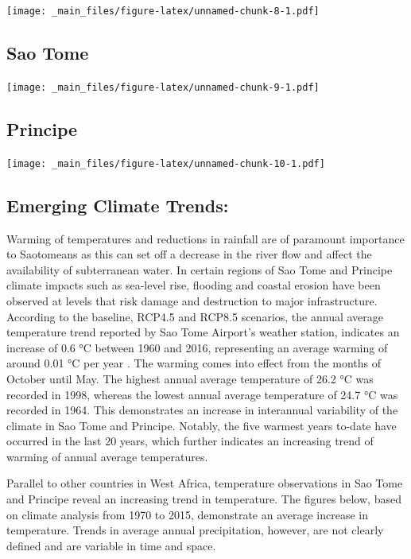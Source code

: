 \documentclass[
]{book}
\begin{document}
\texttt{[image: \_main\_files/figure-latex/unnamed-chunk-8-1.pdf]}

\hypertarget{sao-tome}{%
\subsection{Sao Tome}\label{sao-tome}}

\texttt{[image: \_main\_files/figure-latex/unnamed-chunk-9-1.pdf]}

\hypertarget{principe}{%
\subsection{Principe}\label{principe}}

\texttt{[image: \_main\_files/figure-latex/unnamed-chunk-10-1.pdf]}

\hypertarget{emerging-climate-trends}{%
\subsection{Emerging Climate Trends:}\label{emerging-climate-trends}}

Warming of temperatures and reductions in rainfall are of paramount importance to Saotomeans as this can set off a decrease in the river flow and affect the availability of subterranean water. In certain regions of Sao Tome and Principe climate impacts such as sea-level rise, flooding and coastal erosion have been observed at levels that risk damage and destruction to major infrastructure. According to the baseline, RCP4.5 and RCP8.5 scenarios, the annual average temperature trend reported by Sao Tome Airport's weather station, indicates an increase of 0.6 °C between 1960 and 2016, representing an average warming of around 0.01 °C per year . The warming comes into effect from the months of October until May. The highest annual average temperature of 26.2 °C was recorded in 1998, whereas the lowest annual average temperature of 24.7 °C was recorded in 1964. This demonstrates an increase in interannual variability of the climate in Sao Tome and Principe. Notably, the five warmest years to-date have occurred in the last 20 years, which further indicates an increasing trend of warming of annual average temperatures.

Parallel to other countries in West Africa, temperature observations in Sao Tome and Principe reveal an increasing trend in temperature. The figures below, based on climate analysis from 1970 to 2015, demonstrate an average increase in temperature. Trends in average annual precipitation, however, are not clearly defined and are variable in time and space.
\end{document}
